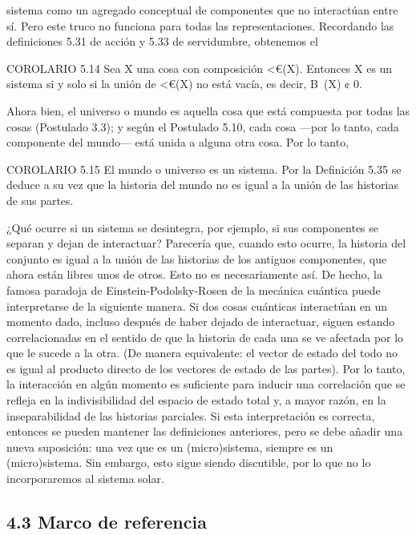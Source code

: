 \begin{justifying}
    sistema como un agregado conceptual de componentes que no interactúan entre sí. Pero
    este truco no funciona para todas las representaciones.
    Recordando las definiciones 5.31 de acción y 5.33 de servidumbre, obtenemos el

    COROLARIO 5.14 Sea X una cosa con composición <€(X). Entonces X es un
    sistema si y solo si la unión de <€(X) no está vacía, es decir, B~(X) ¢ 0.

    Ahora bien, el universo o mundo es aquella cosa que está compuesta por todas las
    cosas (Postulado 3.3); y según el Postulado 5.10, cada cosa —por lo tanto, cada
    componente del mundo— está unida a alguna otra cosa. Por lo tanto, 

    COROLARIO 5.15 El mundo o universo es un sistema.
    Por la Definición 5.35 se deduce a su vez que la historia del mundo no es
    igual a la unión de las historias de sus partes.

    ¿Qué ocurre si un sistema se desintegra, por ejemplo, si sus componentes se separan
    y dejan de interactuar? Parecería que, cuando esto ocurre, la historia
    del conjunto es igual a la unión de las historias de los antiguos
    componentes, que ahora están libres unos de otros. Esto no es necesariamente así. De hecho, la famosa paradoja de Einstein-Podolsky-Rosen de la mecánica cuántica puede interpretarse de la siguiente manera. Si dos cosas cuánticas
    interactúan en un momento dado, incluso después de haber dejado de interactuar,
    siguen estando correlacionadas en el sentido de que la historia de cada una se ve afectada por
    lo que le sucede a la otra. (De manera equivalente: el vector de estado del todo
    no es igual al producto directo de los vectores de estado de las partes). Por lo tanto,
    la interacción en algún momento es suficiente para inducir una correlación que se
    refleja en la indivisibilidad del espacio de estado total y, a
    mayor razón, en la inseparabilidad de las historias parciales. Si esta interpretación es correcta, entonces se pueden mantener las definiciones anteriores, pero se debe añadir una nueva
    suposición: una vez que es un (micro)sistema, siempre es un (micro)sistema. Sin embargo, esto sigue siendo discutible, por lo que no lo incorporaremos al
    sistema solar.

    \subsection*{4.3 Marco de referencia}



\end{justifying}
